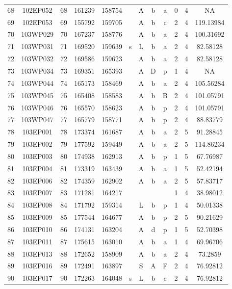 \begin{tabular}{|*{12}{c|}}
68 & 102EP052 & 68 & 161239 & 158754 &  & A & b & a & 0 & 4 & NA \\ 
69 & 102EP053 & 69 & 155792 & 159705 &  & A & b & c & 2 & 4 & 119.13984 \\ 
70 & 103WP029 & 70 & 167237 & 158776 &  & A & b & a & 2 & 4 & 100.31692 \\ 
71 & 103WP031 & 71 & 169520 & 159639 & s & L & b & a & 2 & 4 & 82.58128 \\ 
72 & 103WP032 & 72 & 169586 & 159623 &  & A & b & a & 2 & 4 & 82.58128 \\ 
73 & 103WP034 & 73 & 169351 & 165393 &  & A & D & p & 1 & 4 & NA \\ 
74 & 103WP044 & 74 & 165173 & 158469 &  & A & b & a & 2 & 4 & 105.56284 \\ 
75 & 103WP045 & 75 & 165408 & 158583 &  & A & b & B & 2 & 4 & 101.05791 \\ 
76 & 103WP046 & 76 & 165570 & 158623 &  & A & b & p & 2 & 4 & 101.05791 \\ 
77 & 103WP047 & 77 & 165779 & 158771 &  & A & b & p & 2 & 4 & 88.83779 \\ 
78 & 103EP001 & 78 & 173374 & 161687 &  & A & b & a & 2 & 5 & 91.28845 \\ 
79 & 103EP002 & 79 & 177592 & 159449 &  & A & b & a & 2 & 5 & 114.86234 \\ 
80 & 103EP003 & 80 & 174938 & 162913 &  & A & b & p & 1 & 5 & 67.76987 \\ 
81 & 103EP004 & 81 & 173319 & 163439 &  & A & b & a & 1 & 5 & 52.42194 \\ 
82 & 103EP006 & 82 & 174359 & 162902 &  & A & b & a & 2 & 5 & 57.83717 \\ 
83 & 103EP007 & 83 & 171281 & 164217 &  &  &  &  & 1 & 4 & 38.98012 \\ 
84 & 103EP008 & 84 & 171792 & 159314 &  & L & b & p & 1 & 4 & 50.01338 \\ 
85 & 103EP009 & 85 & 177544 & 164677 &  & A & b & p & 2 & 5 & 90.21629 \\ 
86 & 103EP010 & 86 & 174131 & 163204 &  & A & d & p & 1 & 5 & 52.70398 \\ 
87 & 103EP011 & 87 & 175615 & 163010 &  & A & b & a & 1 & 4 & 69.96706 \\ 
88 & 103EP013 & 88 & 172652 & 158909 &  & A & b & a & 2 & 4 & 73.2859 \\ 
89 & 103EP016 & 89 & 172491 & 163897 &  & S & A & F & 2 & 4 & 76.92812 \\ 
90 & 103EP017 & 90 & 172263 & 164048 & s & L & b & c & 2 & 4 & 76.92812 \\ 

\end{tabular}

